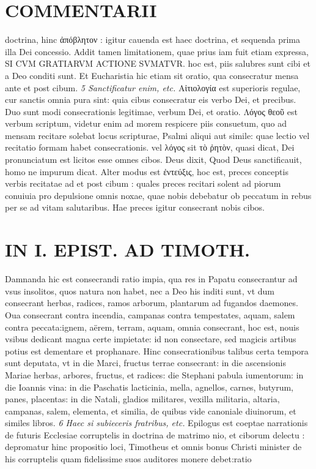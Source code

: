 \documentclass{article}
\begin{document}
\begin{pages}
\section*{COMMENTARII }
\marginpar{[ p.92 ]}\pstart doctrina, hinc ἀπόβλητον : igitur cauenda est haec doctrina, et sequenda prima illa Dei concessio. Addit tamen limitationem, quae prius iam fuit etiam expressa, SI CVM GRATIARVM ACTIONE SVMATVR. hoc est, piis salubres sunt cibi et a Deo conditi sunt. Et Eucharistia hic etiam sit oratio, qua consecratur mensa ante et post cibum.  \pend
\textit{5 Sanctificatur enim, etc. }\pstart Αἰτιολογία est superioris regulae, cur sanctis omnia pura sint: quia cibus consecratur eis verbo Dei, et precibus. Duo sunt modi consecrationis legitimae, verbum Dei, et oratio. Λόγος θεοῦ est verbum scriptum, videtur enim ad morem respicere piis consuetum, quo ad mensam recitare solebat locus scripturae, Psalmi aliqui aut simile: quae lectio vel recitatio formam habet consecrationis. vel λόγος sit τὸ ῤητὸν, quasi dicat, Dei pronunciatum est licitos esse omnes cibos. Deus dixit, Quod Deus sanctificauit, homo ne impurum dicat. Alter modus est ἐντεύξις, hoc est, preces conceptis verbis recitatae ad et post cibum : quales preces recitari solent ad piorum conuiuia pro depulsione omnis noxae, quae nobis debebatur ob peccatum in rebus per se ad vitam salutaribus. Hae preces igitur consecrant nobis cibos.  \pend
\section*{IN I. EPIST. AD TIMOTH. }
\marginpar{[ p.93 ]}\pstart Damnanda hic est consecrandi ratio impia, qua res in Papatu consecrantur ad vsus insolitos, quos natura non habet, nec a Deo his inditi sunt, vt dum consecrant herbas, radices, ramos arborum, plantarum ad fugandos daemones. Oua consecrant contra incendia, campanas contra tempestates, aquam, salem contra peccata:ignem, aërem, terram, aquam, omnia consecrant, hoc est, nouis vsibus dedicant magna certe impietate: id non consectare, sed magicis artibus potius est dementare et prophanare. Hinc consecrationibus talibus certa tempora sunt deputata, vt in die Marci, fructus terrae consecrant: in die ascensionis Mariae herbas, arbores, fructus, et radices: die Stephani pabula iumentorum: in die Ioannis vina: in die Paschatis lacticinia, mella, agnellos, carnes, butyrum, panes, placentas: in die Natali, gladios militares, vexilla militaria, altaria, campanas, salem, elementa, et similia, de quibus vide canoniale diuinorum, et similes libros.  \pend
\textit{6 Haec si subieceris fratribus, etc. }\pstart Epilogus est coeptae narrationis de futuris Ecclesiae corruptelis in doctrina de matrimo nio, et ciborum delectu : depromatur hinc propositio loci, Timotheus et omnis bonus Christi minister de his corruptelis quam fidelissime suos auditores monere debet:ratio  \pend

\end{pages}
\end{document}
